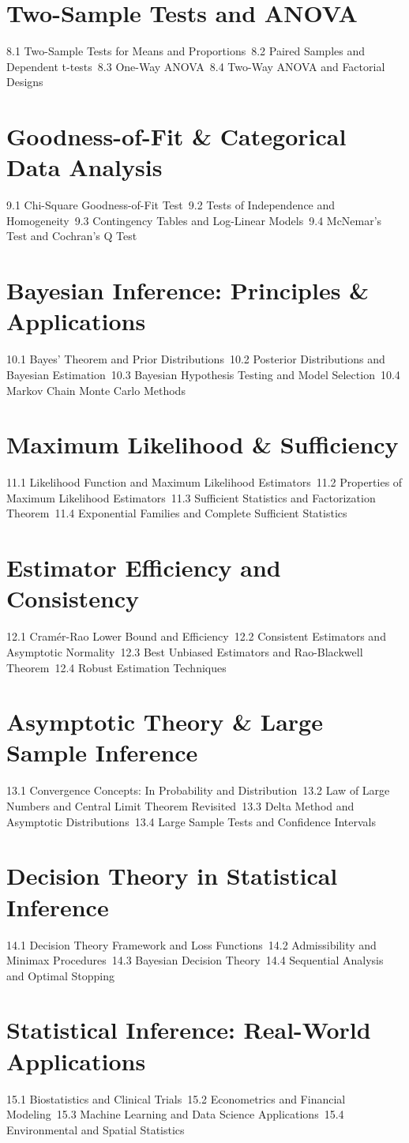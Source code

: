 \section{Two-Sample Tests and ANOVA}
8.1 Two-Sample Tests for Means and Proportions\
8.2 Paired Samples and Dependent t-tests\
8.3 One-Way ANOVA\
8.4 Two-Way ANOVA and Factorial Designs\
\section{Goodness-of-Fit \& Categorical Data Analysis}
9.1 Chi-Square Goodness-of-Fit Test\
9.2 Tests of Independence and Homogeneity\
9.3 Contingency Tables and Log-Linear Models\
9.4 McNemar's Test and Cochran's Q Test\
\section{Bayesian Inference: Principles \& Applications}
10.1 Bayes' Theorem and Prior Distributions\
10.2 Posterior Distributions and Bayesian Estimation\
10.3 Bayesian Hypothesis Testing and Model Selection\
10.4 Markov Chain Monte Carlo Methods\
\section{Maximum Likelihood \& Sufficiency}
11.1 Likelihood Function and Maximum Likelihood Estimators\
11.2 Properties of Maximum Likelihood Estimators\
11.3 Sufficient Statistics and Factorization Theorem\
11.4 Exponential Families and Complete Sufficient Statistics\
\section{Estimator Efficiency and Consistency}
12.1 Cramér-Rao Lower Bound and Efficiency\
12.2 Consistent Estimators and Asymptotic Normality\
12.3 Best Unbiased Estimators and Rao-Blackwell Theorem\
12.4 Robust Estimation Techniques\
\section{Asymptotic Theory \& Large Sample Inference}
13.1 Convergence Concepts: In Probability and Distribution\
13.2 Law of Large Numbers and Central Limit Theorem Revisited\
13.3 Delta Method and Asymptotic Distributions\
13.4 Large Sample Tests and Confidence Intervals\
\section{Decision Theory in Statistical Inference}
14.1 Decision Theory Framework and Loss Functions\
14.2 Admissibility and Minimax Procedures\
14.3 Bayesian Decision Theory\
14.4 Sequential Analysis and Optimal Stopping\
\section{Statistical Inference: Real-World Applications}
15.1 Biostatistics and Clinical Trials\
15.2 Econometrics and Financial Modeling\
15.3 Machine Learning and Data Science Applications\
15.4 Environmental and Spatial Statistics\
